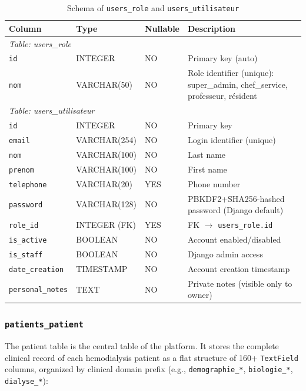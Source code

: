 \documentclass[12pt,a4paper,twoside]{report}
\begin{document}
\begin{table}[htbp]
\centering
\caption{Schema of \texttt{users\_role} and \texttt{users\_utilisateur}}
\label{tab:schema_users}
\small\begin{tabularx}{\textwidth}{p{3.2cm}p{2.8cm}p{1.5cm}X}
\toprule
\textbf{Column} & \textbf{Type} & \textbf{Nullable} & \textbf{Description} \\
\midrule
\multicolumn{4}{l}{\textit{Table: users\_role}} \\
\texttt{id} & INTEGER & NO & Primary key (auto) \\
\texttt{nom} & VARCHAR(50) & NO & Role identifier (unique): super\_admin, chef\_service, professeur, résident \\
\midrule
\multicolumn{4}{l}{\textit{Table: users\_utilisateur}} \\
\texttt{id} & INTEGER & NO & Primary key \\
\texttt{email} & VARCHAR(254) & NO & Login identifier (unique) \\
\texttt{nom} & VARCHAR(100) & NO & Last name \\
\texttt{prenom} & VARCHAR(100) & NO & First name \\
\texttt{telephone} & VARCHAR(20) & YES & Phone number \\
\texttt{password} & VARCHAR(128) & NO & PBKDF2+SHA256-hashed password (Django default) \\
\texttt{role\_id} & INTEGER (FK) & YES & FK $\to$ \texttt{users\_role.id} \\
\texttt{is\_active} & BOOLEAN & NO & Account enabled/disabled \\
\texttt{is\_staff} & BOOLEAN & NO & Django admin access \\
\texttt{date\_creation} & TIMESTAMP & NO & Account creation timestamp \\
\texttt{personal\_notes} & TEXT & NO & Private notes (visible only to owner) \\
\bottomrule
\end{tabularx}
\end{table}

\subsubsection{\texttt{patients\_patient}}

The patient table is the central table of the platform. It stores the complete clinical record of each hemodialysis patient as a flat structure of 160+ \texttt{TextField} columns, organized by clinical domain prefix (e.g., \texttt{demographie\_*}, \texttt{biologie\_*}, \texttt{dialyse\_*}):
\end{document}
